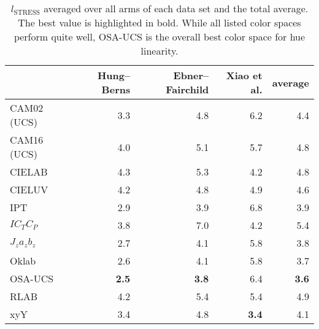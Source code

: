 \documentclass{scrartcl}
\theoremstyle{named}
\begin{document}
\begin{table}
  \centering
  \begin{tabular}{lrrrr}
    \toprule
    & Hung--Berns & Ebner--Fairchild & Xiao et al. & average\\
    \midrule
CAM02 (UCS) &         3.3  &         4.8  &         6.2  &         4.4\\
CAM16 (UCS) &         4.0  &         5.1  &         5.7  &         4.8\\
CIELAB      &         4.3  &         5.3  &         4.2  &         4.8\\
CIELUV      &         4.2  &         4.8  &         4.9  &         4.6\\
IPT         &         2.9  &         3.9  &         6.8  &         3.9\\
$IC_TC_P$   &         3.8  &         7.0  &         4.2  &         5.4\\
$J_za_zb_z$ &         2.7  &         4.1  &         5.8  &         3.8\\
Oklab       &         2.6  &         4.1  &         5.8  &         3.7\\
OSA-UCS     & \textbf{2.5} & \textbf{3.8} &         6.4  & \textbf{3.6}\\
RLAB        &         4.2  &         5.4  &         5.4  &         4.9\\
xyY         &         3.4  &         4.8  & \textbf{3.4} &         4.1\\
    \bottomrule
  \end{tabular}
  \caption{$l_\text{STRESS}$ averaged over all arms of each data set and the total
  average. The best value is highlighted in bold. While all listed color spaces perform
  quite well, OSA-UCS is the overall best color space for hue linearity.}
\end{table}


{}

\end{document}

